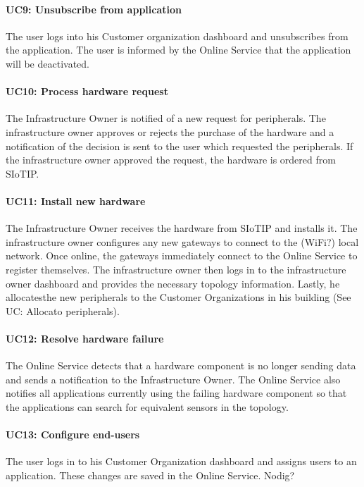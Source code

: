 \documentclass[english,peerreview]{sareport}
\begin{document}
\paragraph{UC9: Unsubscribe from application}
The user logs into his Customer organization dashboard and unsubscribes from the application.  The user is informed by the Online Service that the application will be deactivated.

\paragraph{UC10: Process hardware request}
The Infrastructure Owner is notified of a new request for peripherals. The infrastructure owner approves or rejects the purchase of the hardware and a notification of the decision is sent to the user which requested the peripherals. If the infrastructure owner approved the request, the hardware is ordered from SIoTIP.

\paragraph{UC11: Install new hardware}
The Infrastructure Owner receives the hardware from SIoTIP and installs it. The infrastructure owner configures any new gateways to connect to the (WiFi?) local network. Once online, the gateways immediately connect to the Online Service to register themselves. The infrastructure owner then logs in to the infrastructure owner dashboard and provides the necessary topology information. Lastly, he allocatesthe new peripherals to the Customer Organizations in his building (See UC: Allocato peripherals).

\paragraph{UC12: Resolve hardware failure}
The Online Service detects that a hardware component is no longer sending data and sends a notification to the Infrastructure Owner. The Online Service also notifies all applications currently using the failing hardware component so that the applications can search for equivalent sensors in the topology. 

\paragraph{UC13: Configure end-users}
The user logs in to his Customer Organization dashboard and assigns users to an application. These changes are saved in the Online Service.
Nodig?
\end{document}
